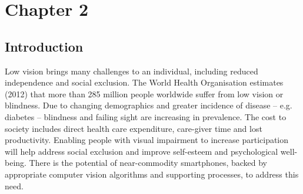 \chapter{Chapter 2}\label{ch:chapter2} %


%
%
%

\section{Introduction}

Low vision brings many challenges to an individual, including reduced independence and social exclusion. The World Health Organisation estimates (2012) that more than 285 million people worldwide suffer from low vision or blindness. Due to changing demographics and greater incidence of disease -- e.g. diabetes -- blindness and failing sight are increasing in prevalence.  The cost to society includes direct health care expenditure, care-giver time and lost productivity.  Enabling people with visual impairment to increase participation will help address social exclusion and improve self-esteem and psychological well-being. There is the potential of near-commodity smartphones, backed by appropriate computer vision algorithms and supporting processes, to address this need.

